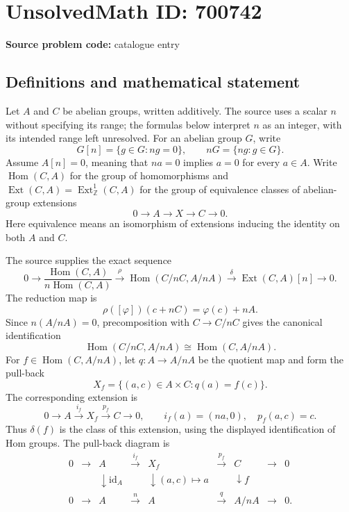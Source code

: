 \documentclass[11pt]{article}
\begin{document}
\section*{UnsolvedMath ID: 700742}
\textbf{Source problem code:} catalogue entry
\subsection{Definitions and mathematical statement}
Let \(A\) and \(C\) be abelian groups, written additively. The source uses a scalar \(n\) without specifying its range; the formulas below interpret \(n\) as an integer, with its intended range left unresolved. For an abelian group \(G\), write
\[
G[n]=\{g\in G:ng=0\},\qquad nG=\{ng:g\in G\}.
\]
Assume \(A[n]=0\), meaning that \(na=0\) implies \(a=0\) for every \(a\in A\). Write \(\operatorname{Hom}(C,A)\) for the group of homomorphisms and \(\operatorname{Ext}(C,A)=\operatorname{Ext}^{1}_{\mathbb Z}(C,A)\) for the group of equivalence classes of abelian-group extensions
\[
0\longrightarrow A\longrightarrow X\longrightarrow C\longrightarrow 0.
\]
Here equivalence means an isomorphism of extensions inducing the identity on both \(A\) and \(C\).

The source supplies the exact sequence
\[
0\longrightarrow
\frac{\operatorname{Hom}(C,A)}{n\operatorname{Hom}(C,A)}
\xrightarrow{\rho}
\operatorname{Hom}(C/nC,A/nA)
\xrightarrow{\delta}
\operatorname{Ext}(C,A)[n]
\longrightarrow 0.
\]
The reduction map is
\[
\rho([\varphi])(c+nC)=\varphi(c)+nA.
\]
Since \(n(A/nA)=0\), precomposition with \(C\to C/nC\) gives the canonical identification
\[
\operatorname{Hom}(C/nC,A/nA)\cong\operatorname{Hom}(C,A/nA).
\]
For \(f\in\operatorname{Hom}(C,A/nA)\), let \(q:A\to A/nA\) be the quotient map and form the pull-back
\[
X_f=\{(a,c)\in A\times C:q(a)=f(c)\}.
\]
The corresponding extension is
\[
0\longrightarrow A\xrightarrow{i_f}X_f\xrightarrow{p_f}C\longrightarrow 0,
\qquad i_f(a)=(na,0),\quad p_f(a,c)=c.
\]
Thus \(\delta(f)\) is the class of this extension, using the displayed identification of Hom groups. The pull-back diagram is
\[
\begin{array}{ccccccccc}
0&\longrightarrow&A&\xrightarrow{i_f}&X_f&\xrightarrow{p_f}&C&\longrightarrow&0\\
&&\downarrow\scriptstyle{\mathrm{id}_A}&&\downarrow\scriptstyle{(a,c)\mapsto a}&&\downarrow\scriptstyle{f}&&\\
0&\longrightarrow&A&\xrightarrow{n}&A&\xrightarrow{q}&A/nA&\longrightarrow&0.
\end{array}
\]
\end{document}
